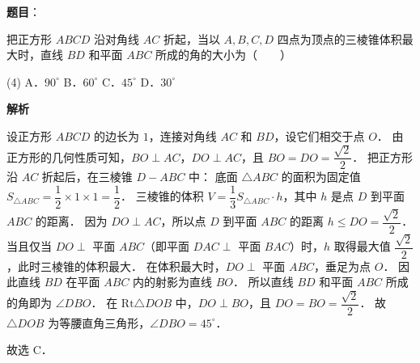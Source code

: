 \begin{answer}

\textbf{题目}：

把正方形 $ABCD$ 沿对角线 $AC$ 折起，当以 $A, B, C, D$ 四点为顶点的三棱锥体积最大时，直线 $BD$ 和平面 $ABC$ 所成的角的大小为\mbox{（　　）}

\begin{gkopts}(4)
\task A．$90^\circ$
\task B．$60^\circ$
\task C．$45^\circ$
\task D．$30^\circ$
\end{gkopts}

\textbf{解析}

设正方形 $ABCD$ 的边长为 $1$，连接对角线 $AC$ 和 $BD$，设它们相交于点 $O$．
由正方形的几何性质可知，$BO \perp AC$，$DO \perp AC$，且 $BO = DO = \dfrac{\sqrt{2}}{2}$．
把正方形沿 $AC$ 折起后，在三棱锥 $D - ABC$ 中：
底面 $\triangle ABC$ 的面积为固定值 $S_{\triangle ABC} = \dfrac{1}{2} \times 1 \times 1 = \dfrac{1}{2}$．
三棱锥的体积 $V = \dfrac{1}{3} S_{\triangle ABC} \cdot h$，其中 $h$ 是点 $D$ 到平面 $ABC$ 的距离．
因为 $DO \perp AC$，所以点 $D$ 到平面 $ABC$ 的距离 $h \leqslant DO = \dfrac{\sqrt{2}}{2}$．
当且仅当 $DO \perp$ 平面 $ABC$（即平面 $DAC \perp$ 平面 $BAC$）时，$h$ 取得最大值 $\dfrac{\sqrt{2}}{2}$，此时三棱锥的体积最大．
在体积最大时，$DO \perp$ 平面 $ABC$，垂足为点 $O$．
因此直线 $BD$ 在平面 $ABC$ 内的射影为直线 $BO$．
所以直线 $BD$ 和平面 $ABC$ 所成的角即为 $\angle DBO$．
在 $\mathrm{Rt}\triangle DOB$ 中，$DO \perp BO$，且 $DO = BO = \dfrac{\sqrt{2}}{2}$．
故 $\triangle DOB$ 为等腰直角三角形，$\angle DBO = 45^\circ$．

故选 C．


\end{answer}
